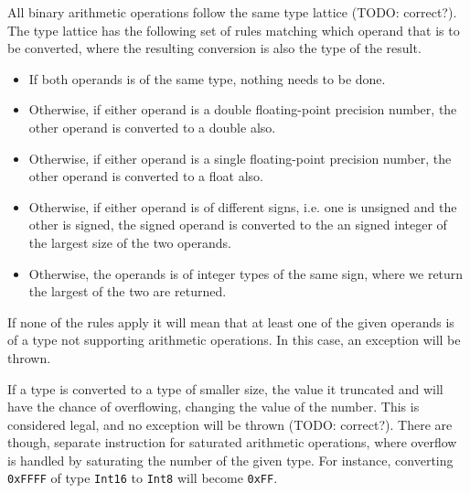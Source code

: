All binary arithmetic operations follow the same type lattice (TODO:
correct?). The type lattice has the following set of rules matching which
operand that is to be converted, where the resulting conversion is also the type
of the result.
\begin{itemize}
  \item If both operands is of the same type, nothing needs to be done.
  \item Otherwise, if either operand is a double floating-point precision number, the other
    operand is converted to a double also.
  \item Otherwise, if either operand is a single floating-point precision number, the other
    operand is converted to a float also.
  \item Otherwise, if either operand is of different signs, i.e. one is unsigned
    and the other is signed, the signed operand is converted to the an signed
    integer of the largest size of the two operands.
  \item Otherwise, the operands is of integer types of the same sign, where we
    return the largest of the two are returned.
\end{itemize}

If none of the rules apply it will mean that at least one of the given operands
is of a type not supporting arithmetic operations. In this case, an exception
will be thrown.

If a type is converted to a type of smaller size, the value it truncated and
will have the chance of overflowing, changing the value of the number. This is
considered legal, and no exception will be thrown (TODO: correct?). There are
though, separate instruction for saturated arithmetic operations, where overflow
is handled by saturating the number of the given type. For instance, converting
{\tt 0xFFFF} of type {\tt Int16} to {\tt Int8} will become {\tt 0xFF}.
